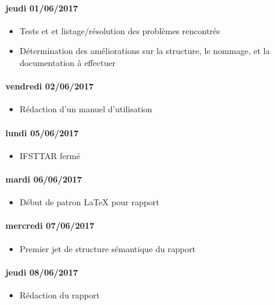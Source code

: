 \paragraph{jeudi 01/06/2017}
\begin{itemize}
  \item Tests et et listage/résolution des problèmes rencontrés
  \item Détermination des améliorations sur la structure, le nommage, et la documentation à effectuer
\end{itemize}

\paragraph{vendredi 02/06/2017}
\begin{itemize}
  \item Rédaction d'un manuel d'utilisation
\end{itemize}

\paragraph{lundi 05/06/2017}
\begin{itemize}
  \item IFSTTAR fermé
\end{itemize}

\paragraph{mardi 06/06/2017}
\begin{itemize}
  \item Début de patron LaTeX pour rapport
\end{itemize}

\paragraph{mercredi 07/06/2017}
\begin{itemize}
  \item Premier jet de structure sémantique du rapport
\end{itemize}

\paragraph{jeudi 08/06/2017}
\begin{itemize}
  \item Rédaction du rapport
\end{itemize}

